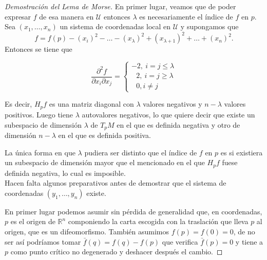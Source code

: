 \begin{proof}[Demostración del Lema de Morse]
    En primer lugar, veamos que de poder expresar $f$ de esa manera en $\mathcal{U}$ entonces $\lambda$ es necesariamente el índice de $f$ en $p$. Sea $(x_1,\dots, x_n)$ un sistema de coordenadas local en $\mathcal{U}$ y supongamos que
    \begin{equation*}
        f=f(p)-(x_i)^2-\dots-(x_\lambda)^2 + (x_{\lambda +1})^2+\dots + (x_n)^2.
    \end{equation*}
    Entonces se tiene que 

    \[
        \frac{\partial^2 f}{\partial x_i \partial x_j}=
        \begin{cases}
            -2, ~i=j\le \lambda\\
            ~~~2, ~i=j\ge \lambda\\
            ~~~0, i\neq j
        \end{cases}
    \]

    Es decir, $H_pf$ es una matriz diagonal con $\lambda$ valores negativos y $n-\lambda$ valores positivos. Luego tiene $\lambda$ autovalores negativos, lo que quiere decir que existe un subespacio de dimensión $\lambda$ de $T_pM$ en el que es definida negativa y otro de dimensión $n-\lambda$ en el que es definida positiva.

    La única forma en que $\lambda$ pudiera ser distinto que el índice de $f$ en $p$ es si existiera un subespacio de dimensión mayor que el mencionado en el que $H_pf$ fuese definida negativa, lo cual es imposible.\\


    Hacen falta algunos preparativos antes de demostrar que el sistema de coordenadas $(y_1,\dots,y_n)$ existe.
    
    En primer lugar podemos asumir sin pérdida de generalidad que, en coordenadas, $p$ es el origen de $\mathbb{R}^n$ componiendo la carta escogida con la traslación que lleva $p$ al origen, que es un difeomorfismo. También asumimos $f(p)=f(0)=0$, de no ser así podríamos tomar $\bar{f}(q)=f(q)-f(p)$ que verifica $\bar{f}(p)=0$ y tiene a $p$ como punto crítico no degenerado y deshacer después el cambio. 


\end{proof}
